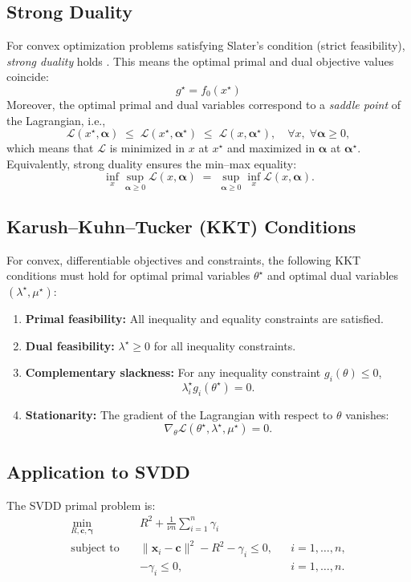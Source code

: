 \documentclass[11pt]{report}
\begin{document}
\subsection{Strong Duality}
For convex optimization problems satisfying Slater's condition (strict feasibility), \emph{strong duality} holds \cite[Section~5.3]{boyd2004convex}.  
This means the optimal primal and dual objective values coincide:
\[
g^\star = f_0(x^\star)
\]
Moreover, the optimal primal and dual variables correspond to a \emph{saddle point} of the Lagrangian, i.e.,
\[
\mathcal{L}(x^\star, \boldsymbol{\alpha}) \;\le\; \mathcal{L}(x^\star, \boldsymbol{\alpha}^\star) 
\;\le\; \mathcal{L}(x, \boldsymbol{\alpha}^\star), 
\quad \forall x, \; \forall \boldsymbol{\alpha} \ge 0,
\]
which means that $\mathcal{L}$ is minimized in $x$ at $x^\star$ and maximized in $\boldsymbol{\alpha}$ at $\boldsymbol{\alpha}^\star$.  
Equivalently, strong duality ensures the min–max equality:
\[
\inf_x \sup_{\boldsymbol{\alpha} \ge 0} \mathcal{L}(x,\boldsymbol{\alpha})
\;=\;
\sup_{\boldsymbol{\alpha} \ge 0} \inf_x \mathcal{L}(x,\boldsymbol{\alpha}).
\]

\subsection{Karush–Kuhn–Tucker (KKT) Conditions}
For convex, differentiable objectives and constraints, the following KKT conditions must hold for optimal primal variables $\theta^\star$ and optimal dual variables $(\lambda^\star, \mu^\star)$:
\begin{enumerate}
    \item \textbf{Primal feasibility:} All inequality and equality constraints are satisfied.
    \item \textbf{Dual feasibility:} $\lambda^\star \geq 0$ for all inequality constraints.
    \item \textbf{Complementary slackness:} For any inequality constraint $g_i(\theta) \leq 0$,
    \[
    \lambda_i^\star g_i(\theta^\star) = 0.
    \]
    \item \textbf{Stationarity:} The gradient of the Lagrangian with respect to $\theta$ vanishes:
    \[
    \nabla_\theta \mathcal{L}(\theta^\star, \lambda^\star, \mu^\star) = 0.
    \]
\end{enumerate}

\subsection{Application to SVDD}
The SVDD primal problem is:
\begin{align}
\min_{R, \mathbf{c}, \boldsymbol{\gamma}} \quad & R^2 + \frac{1}{\nu n} \sum_{i=1}^{n} \gamma_i \label{svdd-primal} \\
\text{subject to} \quad 
& \|\mathbf{x}_i - \mathbf{c} \|^2 - R^2 - \gamma_i \leq 0, 
&& i = 1, \ldots, n, \label{svdd-const1} \\
& -\gamma_i \leq 0, 
&& i = 1, \ldots, n. \label{svdd-const2}
\end{align}
\end{document}
